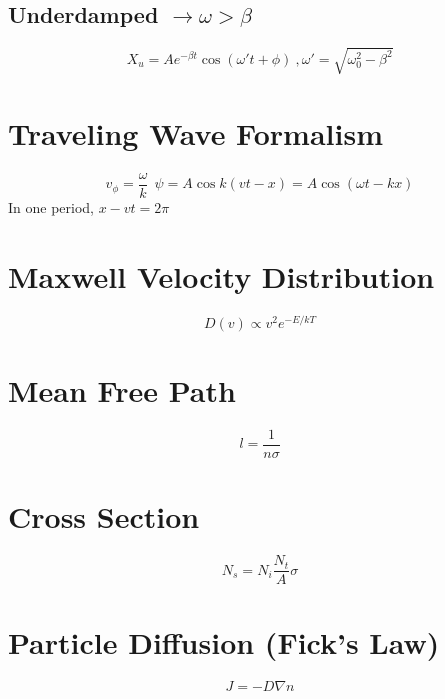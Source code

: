 \documentclass[10pt,a4paper]{article}
\begin{document}
\subsection{Underdamped $\rightarrow \omega > \beta$} %
\label{sub:underdamped_}
\begin{equation}
    X_u = Ae^{-\beta t}\cos(\omega't + \phi)~,\omega' = \sqrt{\omega_0^2 - \beta^2}
\end{equation}

\section{Traveling Wave Formalism} %
\label{sec:traveling_wave_formalism}
\begin{equation}
    v_\phi = \frac{\omega}{k}~~ \psi = A\cos k (vt-x) = A\cos (\omega t- kx)
\end{equation}
In one period, $x-vt=2\pi$

\section{Maxwell Velocity Distribution} %
\label{sec:maxwell_velocity_distribution}
\begin{equation}
    D(v) \propto v^2 e^{-E/kT}
\end{equation}

\section{Mean Free Path} %
\label{sec:mean_free_path}
\begin{equation}
    l = \frac{1}{n\sigma}
\end{equation}

\section{Cross Section} %
\label{sec:cross_section}
\begin{equation}
    N_s = N_i \frac{N_t}{A} \sigma
\end{equation}

\section{Particle Diffusion (Fick's Law)} %
\label{sec:particle_diffusion}
\begin{equation}
    J = - D \nabla n
\end{equation}
\end{document}
